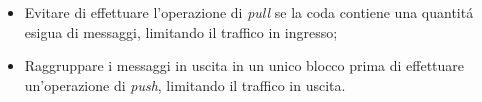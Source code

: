 \documentclass{article}
\begin{document}
\begin{itemize}
\item{Evitare di effettuare l'operazione di \textit{pull} se la coda contiene una quantit\'a esigua di messaggi, limitando il traffico in ingresso;}
\item{Raggruppare i messaggi in uscita in un unico blocco prima di effettuare un'operazione di \textit{push}, limitando il traffico in uscita.} 
\end{itemize}



%

%
\newpage
\end{document}
